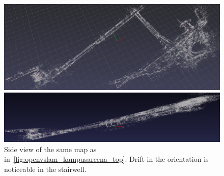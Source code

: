 \documentclass[11pt, letterpaper, twoside]{article}
\begin{document}
\begin{figure}[tb]
    \centering

    \includegraphics[width=\textwidth]{openvslam_kampusareena_top.png}
    \caption{%
        Mapping of the first and second floors of Kampusareena and the corridor
        up to the third floor of Tietotalo (223~725 points), generated with
        OpenVSLAM using as input the rectified stereo pair from the ZED camera.
        Some drift is noticeable between the two floors of Kampusareena, in the
        circular balconies. Drift is also noticeable in the long corridor and
        in the bridge between Sähkötalo and Kampusareena, but additional loop
        closures could have helped reducing it.
    }\label{fig:openvslam_kampusareena_top}

    \vspace{1em}

    \includegraphics[width=\textwidth]{openvslam_kampusareena_side.png}
    \caption{%
        Side view of the same map as in~\cref{fig:openvslam_kampusareena_top}.
        Drift in the orientation is noticeable in the stairwell.
    }\label{fig:openvslam_kampusareena_side}

    \vspace{1em}


\end{figure}
\end{document}
